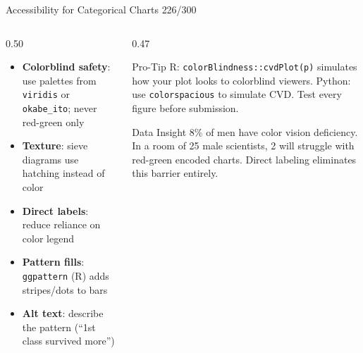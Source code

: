 \documentclass[10pt]{beamer}
\newcommand{\smark}[1]{\hfill{\scriptsize\color{codegray}#1}}
\begin{document}
\begin{frame}{Accessibility for Categorical Charts}
\smark{226/300}
\begin{columns}[T]
\begin{column}{0.50\textwidth}
\begin{itemize}
    \item \textbf{Colorblind safety}: use palettes from \texttt{viridis} or \texttt{okabe\_ito}; never red-green only
    \item \textbf{Texture}: sieve diagrams use hatching instead of color
    \item \textbf{Direct labels}: reduce reliance on color legend
    \item \textbf{Pattern fills}: \texttt{ggpattern} (R) adds stripes/dots to bars
    \item \textbf{Alt text}: describe the pattern (``1st class survived more'')
\end{itemize}
\end{column}
\begin{column}{0.47\textwidth}
\begin{alertblock}{Pro-Tip}
    \scriptsize R: \texttt{colorBlindness::cvdPlot(p)} simulates how your plot looks to colorblind viewers. Python: use \texttt{colorspacious} to simulate CVD. Test every figure before submission.
\end{alertblock}
\vspace{0.1cm}
\begin{exampleblock}{Data Insight}
    \scriptsize 8\% of men have color vision deficiency. In a room of 25 male scientists, 2 will struggle with red-green encoded charts. Direct labeling eliminates this barrier entirely.
\end{exampleblock}
\end{column}
\end{columns}
\end{frame}
\end{document}
